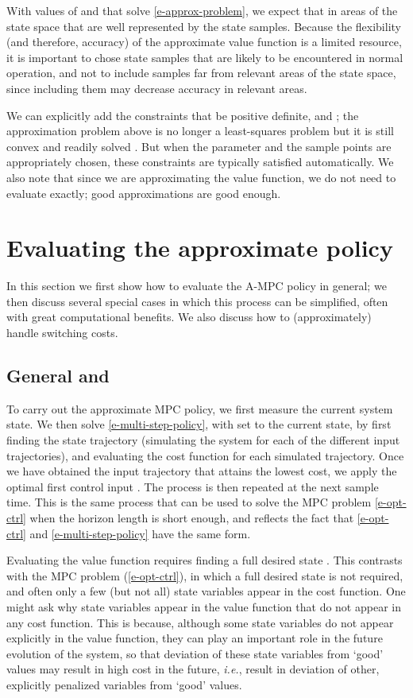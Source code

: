 \documentclass[12pt]{article}
\newcommand{\ie}{{\it i.e.}}
\begin{document}
With values of  and  that solve \eqref{e-approx-problem},
we expect that  
in areas of the state space that are well represented by the state samples.
Because the flexibility (and therefore, accuracy)
of the approximate value function is a limited resource,
it is important to chose state samples that are likely
to be encountered in normal operation,
and not to include samples
far from relevant areas of the state space,
since including them may decrease accuracy in relevant areas.

We can explicitly add the constraints that  be positive definite,
and ; the approximation problem above is no longer
a least-squares problem but it is still convex and readily solved
\cite{boyd2004convex}.
But when the parameter  and the sample points are appropriately
chosen, these constraints are typically satisfied automatically.
We also note that since we are approximating the value function, we 
do not need to evaluate  exactly; good approximations are
good enough.



\section{Evaluating the approximate policy}
\label{s-implementation}
In this section we first show how to evaluate the A-MPC policy in general;
we then discuss several special cases
in which this process can be simplified,
often with great computational benefits.
We also discuss how to (approximately) handle switching costs.


\subsection{General  and }
To carry out the approximate MPC policy,
we first measure the current system state.
We then solve \eqref{e-multi-step-policy},
with  set to the current state,
by first finding the state trajectory 
(simulating the system for each of the  different input trajectories),
and evaluating the cost function for each simulated trajectory.
Once we have obtained the input trajectory that attains the lowest cost,
we apply the optimal first control input .
The process is then repeated at the next sample time.
This is the same process that can be used to solve the MPC problem \eqref{e-opt-ctrl}
when the horizon length is short enough,
and reflects the fact that 
\eqref{e-opt-ctrl} and \eqref{e-multi-step-policy}
have the same form.

Evaluating the value function requires finding a full desired state .
This contrasts with the MPC problem (\ref{e-opt-ctrl}),
in which a full desired state is not required,
and often only a few (but not all) state variables appear in the cost function.
One might ask why state variables appear in the value function
that do not appear in any cost function.
This is because, although some state variables do not appear explicitly
in the value function, 
they can play an important role in the future evolution of the system,
so that deviation of these state variables from `good' values
may result in high cost in the future,
\ie, result in deviation of other, explicitly penalized variables from `good' values.
\end{document}
